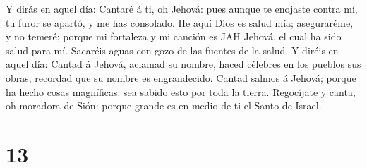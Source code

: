 Y dirás en aquel día: Cantaré á ti, oh Jehová: pues aunque
te enojaste contra mí, tu furor se apartó, y me has consolado.
 He aquí Dios es salud mía; aseguraréme, y no temeré; porque
mi fortaleza y mi canción es JAH Jehová, el cual ha sido salud para mí.
 Sacaréis aguas con gozo de las fuentes de la salud.
 Y diréis en aquel día: Cantad á Jehová, aclamad su nombre,
haced célebres en los pueblos sus obras, recordad que su nombre es
engrandecido.  Cantad salmos á Jehová; porque ha hecho cosas
magníficas: sea sabido esto por toda la tierra.  Regocíjate
y canta, oh moradora de Sión: porque grande es en medio de ti el Santo
de Israel.

\hypertarget{section-12}{%
\section{13}\label{section-12}}

